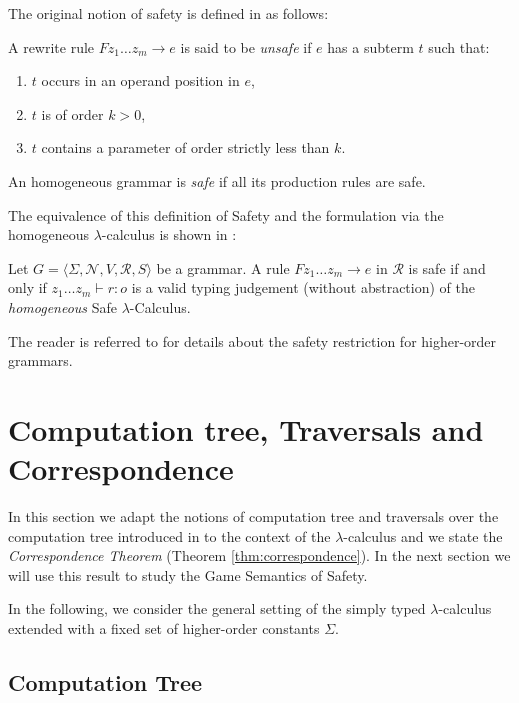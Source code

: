 \documentclass{llncs}
\begin{document}
The original notion of safety is defined in \cite{KNU02} as follows:
\begin{definition}
  A rewrite rule $F z_1 \ldots z_m \rightarrow e$ is said to be \emph{unsafe} if $e$ has a subterm $t$ such that:
  \begin{enumerate}
    \item $t$ occurs in an operand position in $e$,
    \item $t$ is of order $k>0$,
    \item $t$ contains a parameter of order strictly less than $k$.
  \end{enumerate}
An homogeneous grammar is \emph{safe} if all its production rules are safe.
\end{definition}


The equivalence of this definition of Safety and the formulation via the homogeneous $\lambda$-calculus is shown in \cite{demirandathesis}:
\begin{proposition} Let $G = \langle \Sigma, \mathcal{N}, V, \mathcal{R}, S \rangle$ be a grammar.
A rule $F z_1 \ldots z_m \rightarrow e$ in $\mathcal{R}$ is safe if and only if
$ z_1 \ldots z_m \vdash r : o$
is a valid typing judgement (without abstraction) of the \emph{homogeneous} Safe $\lambda$-Calculus.
\end{proposition}


The reader is referred to \cite{KNU02,demirandathesis,safety-mirlong2004}
for details about the safety restriction for higher-order grammars.



\section{Computation tree, Traversals and Correspondence}

In this section we adapt the notions of computation tree and
traversals over the computation tree introduced in \cite{OngLics2006} to the context of the $\lambda$-calculus 
and we state the \emph{Correspondence Theorem} (Theorem \ref{thm:correspondence}).
In the next section we will use this result to study the Game Semantics of Safety.

In the following, we consider the general setting of the simply typed
$\lambda$-calculus extended with a fixed set of higher-order constants $\Sigma$.


\subsection{Computation Tree}
\end{document}
